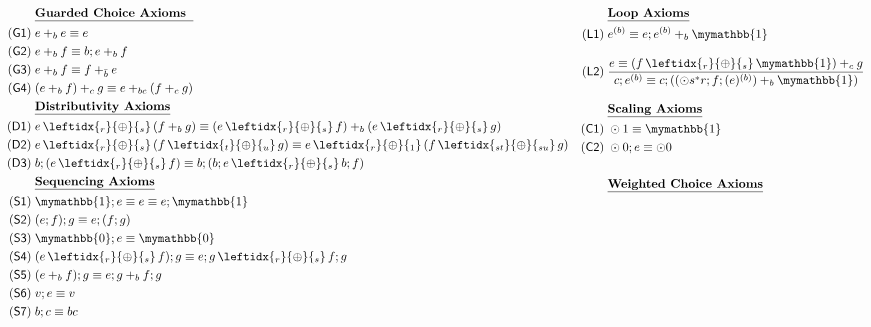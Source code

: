 \documentclass[a4paper,UKenglish,cleveref, autoref, thm-restate]{lipics-v2021}
\newcommand{\WC}[2]{\,\leftidx{_{#1}}{{\oplus}}{_{#2}}\,}
\newcommand{\Ax}[1]{\ensuremath{\mathsf{#1}}}
\newcommand{\bskip}{\mymathbb{1}}
\newcommand{\babort}{\mymathbb{0}}
\theoremstyle{plain}\newtheoremrep{thm}{Theorem}[section]
\begin{document}
	\begin{figure}[t!]\vspace{-.8cm}
		\begin{equation*}
			\begin{aligned}[t]
				&\textbf{\underline{Guarded Choice Axioms\phantom{q}}} \\
				\Ax{(G1)}\; &  e +_b e \equiv e \\
				\Ax{(G2)}\; &  e+_b f\equiv b;e+_{b}f\\
				\Ax{(G3)}\; &  e +_b f \equiv f+_{\bar b} e \\
				\Ax{(G4)}\; &  (e+_b f)+_cg\equiv e+_{bc}(f+_cg) \\
				&\textbf{\underline{Distributivity Axioms}} \\
				\Ax{(D1)}\; &  e\WC{r}{s} (f+_b g) \equiv (e \WC{r}{s} f) +_b (e \WC{r}{s} g) \\
				\Ax{(D2)}\; &  e\WC{r}{s} (f \WC{t}{u} g) \equiv e\WC{r}{1} (f \WC{st}{su} g) \\
				\Ax{(D3)}\; &  b;(e \WC{r}{s} f) \equiv b;(b;e \WC{r}{s} b;f)\\
				&\textbf{\underline{Sequencing Axioms}} \\
				\Ax{(S1)}\; &  \bskip; e \equiv e \equiv e; \bskip \\
				\Ax{(S2)}\; &  (e; f); g \equiv e; (f; g) \\
				\Ax{(S3)}\; &  \babort ; e\equiv \babort\\
				\Ax{(S4)}\; &  (e\WC{r}{s}f);g\equiv e;g \WC{r}{s} f;g \\
				\Ax{(S5)}\; &  (e+_bf);g\equiv e;g +_b f;g\\
				\Ax{(S6)}\; &  v ; e\equiv v \\
				\Ax{(S7)}\; &  b;c\equiv bc
			\end{aligned}\quad
			\begin{aligned}[t]
				&\textbf{\underline{Loop Axioms}} \\
				\Ax{(L1)}\; &  e^{(b)} \equiv e ; e^{(b)} +_b \bskip \\[2ex]
				\Ax{(L2)}\; &  \frac{e\equiv (f \WC{r}{s} \bskip)+_c g}{c;e^{(b)}\equiv c;((\odot s^*r ;f;(e)^{(b)})+_b \bskip)}\\[2ex]	
				&\textbf{\underline{Scaling Axioms}} \\
				\Ax{(C1)}\; &  \odot 1 \equiv \bskip\\
				\Ax{(C2)}\; &  \odot 0;e \equiv \odot 0\\ \\
				&\textbf{\underline{Weighted Choice Axioms}} \\

\end{aligned}
\end{equation*}
\end{figure}
\end{document}
